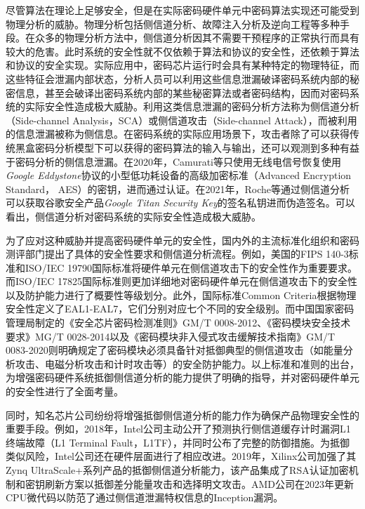 {	尽管算法在理论上足够安全，但是在实际密码硬件单元中密码算法实现还可能受到物理分析的威胁。物理分析包括侧信道分析、故障注入分析\citep{Biham97}及逆向工程\citep{Perrin17}等多种手段。在众多的物理分析方法中，侧信道分析因其不需要干预程序的正常执行而具有较大的危害。此时系统的安全性就不仅依赖于算法和协议的安全性，还依赖于算法和协议的安全实现。实际应用中，密码芯片运行时会具有某种特定的物理特征，而这些特征会泄漏内部状态，分析人员可以利用这些信息泄漏破译密码系统内部的秘密信息，甚至会破译出密码系统内部的某些秘密算法或者密码结构，因而对密码系统的实际安全性造成极大威胁。利用这类信息泄漏的密码分析方法称为侧信道分析（Side-channel Analysis，SCA）或侧信道攻击（Side-channel Attack），而被利用的信息泄漏被称为侧信息。在密码系统的实际应用场景下，攻击者除了可以获得传统黑盒密码分析模型下可以获得的密码算法的输入与输出，还可以观测到多种有益于密码分析的侧信息泄漏。在2020年，Camurati等\citep{Camurati20}只使用无线电信号恢复使用\textit{Google Eddystone}\citep{Eddystone}协议的小型低功耗设备的高级加密标准（Advanced Encryption Standard， AES）的密钥，进而通过认证。在2021年，Roche等\citep{Roche21}通过侧信道分析可以获取谷歌安全产品\textit{Google Titan Security Key}\citep{Titan}的签名私钥进而伪造签名。{\color{\xchange}可以看出，侧信道分析对密码系统的实际安全性造成极大威胁。}
	
	
	为了应对这种威胁并提高密码硬件单元的安全性，国内外的主流标准化组织和密码测评部门提出了具体的安全性要求和侧信道分析流程。例如，美国的FIPS 140-3标准\citep{FIPS140-3}和ISO/IEC 19790\citep{ISO/IEC19790}国际标准将硬件单元在侧信道攻击下的安全性作为重要要求。而ISO/IEC 17825\citep{ISO/IEC17825}国际标准则更加详细地对密码硬件单元在侧信道攻击下的安全性以及防护能力进行了概要性等级划分。此外，国际标准Common Criteria\citep{CCMB-2017-04-001}根据物理安全性定义了EAL1-EAL7，它们分别对应七个不同的安全级别。而中国国家密码管理局制定的《安全芯片密码检测准则》GM/T 0008-2012\citep{GM/T0008}、《密码模块安全技术要求》MG/T 0028-2014\citep{GM/T0028}以及《密码模块非入侵式攻击缓解技术指南》GM/T 0083-2020\citep{GM/T0083}则明确规定了密码模块必须具备针对抵御典型的侧信道攻击（如能量分析攻击、电磁分析攻击和计时攻击等）的安全防护能力。以上标准和准则的出台，为增强密码硬件系统抵御侧信道分析的能力提供了明确的指导，并对密码硬件单元的安全性进行了全面考量。
	
	同时，知名芯片公司纷纷将增强抵御侧信道分析的能力作为确保产品物理安全性的重要手段。例如，2018年，Intel公司主动公开了预测执行侧信道缓存计时漏洞L1终端故障（L1 Terminal Fault，L1TF），并同时公布了完整的防御措施\citep{L1TF}。为抵御类似风险，Intel公司还在硬件层面进行了相应改进\citep{AffectedProcessors}。2019年，Xilinx公司加强了其Zynq UltraScale+系列产品的抵御侧信道分析能力，该产品集成了RSA认证加密机制和密钥刷新方案以抵御差分能量攻击和选择明文攻击\citep{UG1085}。AMD公司在2023年更新CPU微代码以防范了通过侧信道泄漏特权信息的Inception漏洞\citep{AMD-SB-7005}。
	
}
